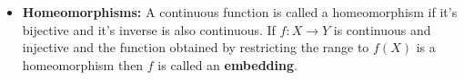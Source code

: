 \documentclass[a4paper]{book}
\theoremstyle{definition}
\newtheorem{theorem}{Theorem}[section]
\theoremstyle{ejemplo}
\theoremstyle{demostracion}
\begin{document}
\begin{itemize}
\begin{theorem}[Continuous functions on product spaces]
Let $f:A\rightarrow {\displaystyle \prod_{i\in I}X_{i} }$ be a function between topological spaces. We can see that $f(x)=(f_{i}(x))_{i\in I}$ for functions $f_{i}:A\rightarrow X_{i}$. Then, in the product topology $f$ is continuous iff $f_{i}$ is continuous for every $i$.
\end{theorem}

\item
\textbf{Homeomorphisms: }A continuous function is called a homeomorphism if it's bijective and it's inverse is also continuous. If $f:X\rightarrow Y$ is continuous and injective and the function obtained by restricting the range to $f(X)$ is a homeomorphism then $f$ is called an \textbf{embedding}.

\end{itemize}
\end{document}
